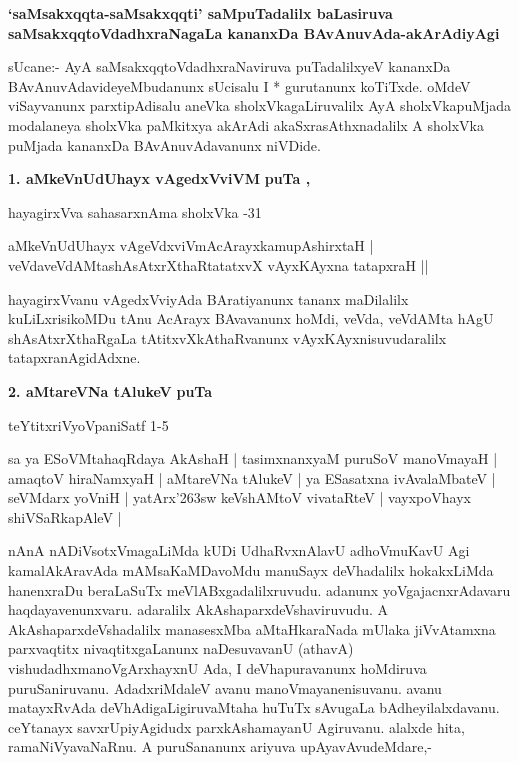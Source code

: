 \begin{center}
{\large {\bf `saMsakxqqta-saMsakxqqti' saMpuTadalilx baLasiruva saMsakxqqtoVdadhxraNagaLa kananxDa BAvAnuvAda-akArAdiyAgi}}
\end{center}


sUcane:- AyA saMsakxqqtoVdadhxraNaviruva puTadalilxyeV kananxDa BAvAnuvAdavideyeMbudanunx sUcisalu I * gurutanunx koTiTxde. oMdeV viSayvanunx parxtipAdisalu aneVka sholxVkagaLiruvalilx AyA sholxVkapuMjada modalaneya sholxVka paMkitxya akArAdi akaSxrasAthxnadalilx A sholxVka puMjada kananxDa BAvAnuvAdavanunx niVDide.

\medskip
\noindent
\textbf{1. aMkeVnUdUhayx vAgedxVviVM} \hfill{\bf puTa \pageref{page64b},\pageref{page84}}

\hfill{hayagirxVva sahasarxnAma sholxVka -31}

\smallskip
\begin{shloka}
aMkeVnUdUhayx vAgeVdxviVmAcArayxkamupAshirxtaH |\\
veVdaveVdAMtashAsAtxrXthaRtatatxvX	vAyxKAyxna tatapxraH ||
\end{shloka}

hayagirxVvanu vAgedxVviyAda BAratiyanunx tananx maDilalilx kuLiLxrisikoMDu tAnu AcArayx BAvavanunx hoMdi, veVda, veVdAMta hAgU shAsAtxrXthaRgaLa tAtitxvXkAthaRvanunx vAyxKAyxnisuvudaralilx tatapxranAgidAdxne.

\medskip
\noindent
\textbf{2. aMtareVNa tAlukeV} \hfill{\bf puTa \pageref{page124b}}

\hfill{teYtitxriVyoVpaniSatf 1-5}

\smallskip
sa ya ESoVMtahaqRdaya AkAshaH | tasimxnanxyaM puruSoV manoVmayaH | amaqtoV hiraNamxyaH | aMtareVNa tAlukeV | ya ESasatxna ivAvalaMbateV | seVMdarx yoVniH | yatArx\char'263sw keVshAMtoV vivataRteV | vayxpoVhayx shiVSaRkapAleV |

nAnA nADiVsotxVmagaLiMda kUDi UdhaRvxnAlavU adhoVmuKavU Agi kamalAkAravAda mAMsaKaMDavoMdu manuSayx deVhadalilx hokakxLiMda hanenxraDu beraLaSuTx meVlABxgadalilxruvudu. adanunx yoVgajacnxrAdavaru haqdayavenunxvaru. adaralilx AkAshaparxdeVshaviruvudu. A AkAshaparxdeVshadalilx manasesxMba aMtaHkaraNada mUlaka jiVvAtamxna parxvaqtitx nivaqtitxgaLanunx naDesuvavanU (athavA) vishudadhxmanoVgArxhayxnU Ada, I deVhapuravanunx hoMdiruva puruSaniruvanu. AdadxriMdaleV avanu manoVmayanenisuvanu. avanu matayxRvAda deVhAdigaLigiruvaMtaha huTuTx sAvugaLa bAdheyilalxdavanu. ceYtanayx savxrUpiyAgidudx parxkAshamayanU Agiruvanu. alalxde hita, ramaNiVyavaNaRnu. A puruSananunx ariyuva upAyavAvudeMdare,-

